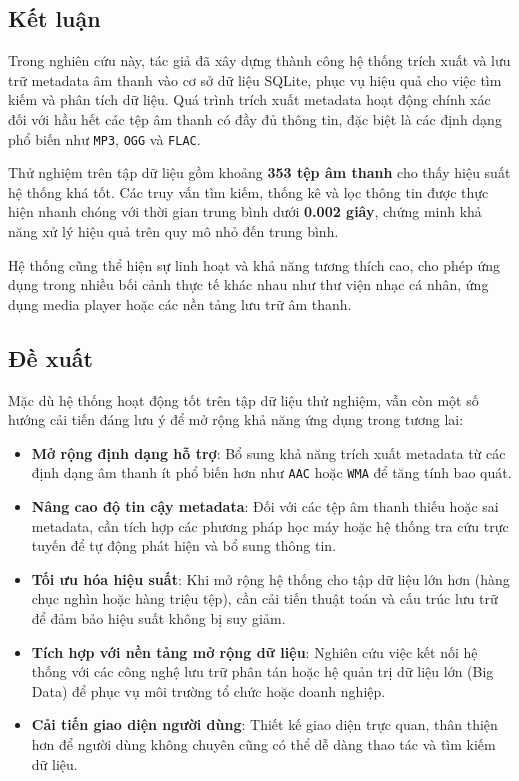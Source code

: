 \documentclass[conference]{IEEEtran}
\begin{document}
\subsection{Kết luận}
Trong nghiên cứu này, tác giả đã xây dựng thành công hệ thống trích xuất và lưu trữ metadata âm thanh vào cơ sở dữ liệu SQLite, phục vụ hiệu quả cho việc tìm kiếm và phân tích dữ liệu. Quá trình trích xuất metadata hoạt động chính xác đối với hầu hết các tệp âm thanh có đầy đủ thông tin, đặc biệt là các định dạng phổ biến như \texttt{MP3}, \texttt{OGG} và \texttt{FLAC}.

Thử nghiệm trên tập dữ liệu gồm khoảng \textbf{353 tệp âm thanh} cho thấy hiệu suất hệ thống khá tốt. Các truy vấn tìm kiếm, thống kê và lọc thông tin được thực hiện nhanh chóng với thời gian trung bình dưới \textbf{0.002 giây}, chứng minh khả năng xử lý hiệu quả trên quy mô nhỏ đến trung bình.

Hệ thống cũng thể hiện sự linh hoạt và khả năng tương thích cao, cho phép ứng dụng trong nhiều bối cảnh thực tế khác nhau như thư viện nhạc cá nhân, ứng dụng media player hoặc các nền tảng lưu trữ âm thanh.

\subsection{Đề xuất}
Mặc dù hệ thống hoạt động tốt trên tập dữ liệu thử nghiệm, vẫn còn một số hướng cải tiến đáng lưu ý để mở rộng khả năng ứng dụng trong tương lai:

\begin{itemize}
    \item \textbf{Mở rộng định dạng hỗ trợ}: Bổ sung khả năng trích xuất metadata từ các định dạng âm thanh ít phổ biến hơn như \texttt{AAC} hoặc \texttt{WMA} để tăng tính bao quát.
    
    \item \textbf{Nâng cao độ tin cậy metadata}: Đối với các tệp âm thanh thiếu hoặc sai metadata, cần tích hợp các phương pháp học máy hoặc hệ thống tra cứu trực tuyến để tự động phát hiện và bổ sung thông tin.
    
    \item \textbf{Tối ưu hóa hiệu suất}: Khi mở rộng hệ thống cho tập dữ liệu lớn hơn (hàng chục nghìn hoặc hàng triệu tệp), cần cải tiến thuật toán và cấu trúc lưu trữ để đảm bảo hiệu suất không bị suy giảm.
    
    \item \textbf{Tích hợp với nền tảng mở rộng dữ liệu}: Nghiên cứu việc kết nối hệ thống với các công nghệ lưu trữ phân tán hoặc hệ quản trị dữ liệu lớn (Big Data) để phục vụ môi trường tổ chức hoặc doanh nghiệp.
    
    \item \textbf{Cải tiến giao diện người dùng}: Thiết kế giao diện trực quan, thân thiện hơn để người dùng không chuyên cũng có thể dễ dàng thao tác và tìm kiếm dữ liệu.
\end{itemize}
\end{document}
